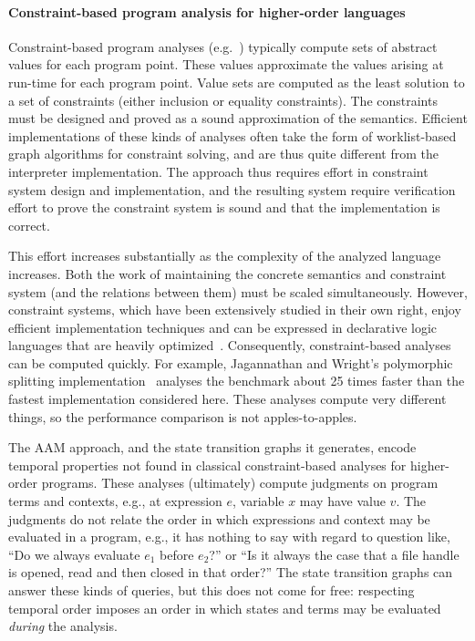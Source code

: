 \documentclass[preprint,onecolumn,9pt]{sigplanconf} %
\begin{document}
\paragraph{Constraint-based program analysis for higher-order languages}

Constraint-based program analyses
(e.g.~\cite{dvanhorn:nielson-nielson-popl97,dvanhorn:wright-jagannathan-toplas98,dvanhorn:Meunier2006Modular})
typically compute sets of abstract values for each program point.
These values approximate the values arising at run-time for each
program point.  Value sets are computed as the least solution to a set
of constraints (either inclusion or equality constraints).  The
constraints must be designed and proved as a sound approximation of
the semantics.  Efficient implementations of these kinds of analyses
often take the form of worklist-based graph algorithms for constraint
solving, and are thus quite different from the interpreter
implementation.  The approach thus requires effort in constraint
system design and implementation, and the resulting system require
verification effort to prove the constraint system is sound and that
the implementation is correct.

This effort increases substantially as the complexity of the analyzed
language increases.  Both the work of maintaining the concrete
semantics and constraint system (and the relations between them) must
be scaled simultaneously.  However, constraint systems, which have
been extensively studied in their own right, enjoy efficient
implementation techniques and can be expressed in declarative logic
languages that are heavily
optimized~\cite{dvanhorn:bravenboer-smaragdakis-oopsla09}.
Consequently, constraint-based analyses can be computed quickly.  For
example, Jagannathan and Wright's polymorphic splitting
implementation~\cite{dvanhorn:wright-jagannathan-toplas98} analyses
the \Church{} benchmark about 25 times faster than the fastest
implementation considered here.  These analyses compute very different
things, so the performance comparison is not apples-to-apples.

The AAM approach, and the state transition graphs it generates, encode
temporal properties not found in classical constraint-based analyses
for higher-order programs.
%
These analyses (ultimately) compute judgments on program terms and
contexts, e.g., at expression $e$, variable $x$ may have value $v$.
%
The judgments do not relate the order in which expressions and context
may be evaluated in a program, e.g., it has nothing
to say with regard to question like, ``Do we always evaluate $e_1$
before $e_2$?'' or ``Is it always the case that a file handle is
opened, read and then closed in that order?''
%
The state transition graphs can answer these kinds of queries, but
this does not come for free: respecting temporal order imposes an
order in which states and terms may be evaluated \emph{during} the
analysis.
\end{document}
